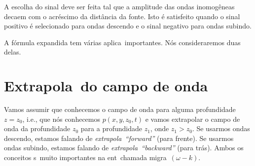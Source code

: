 A escolha do sinal deve ser feita tal que a amplitude das ondas
inomog\^eneas decaem com o acr\'escimo da dist\^ancia da fonte. Isto
\'e satisfeito quando o sinal positivo \'e selecionado para ondas
descendo e o sinal negativo para ondas subindo.

A f\'ormula expandida  tem v\'arias aplica\coes\
importantes. N\'os consideraremos duas delas.


\section{Extrapola\cao\ do campo de onda} \label{extra}

Vamos assumir que conhecemos o campo de onda para alguma profundidade
$z=z_0$, i.e., que n\'os conhecemos $p(x,y,z_0,t)$ e vamos extrapolar
o campo de onda da profundidade $z_0$ para a profundidade $z_1$, onde
$z_1 > z_0$. Se usarmos ondas descendo, estamos falando de
{\it extrapola\cao\ ``forward''} (para frente). Se usarmos ondas subindo,
estamos falando de {\it extrapola\cao\ ``backward''} (para tr\'as). Ambos
os conceitos s\ao\ muito importantes na ent\ao\ chamada migra\cao\
$(\omega - k)$.

